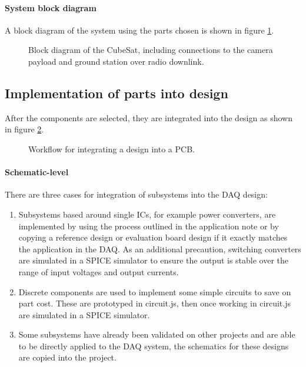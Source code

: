 \documentclass[a4paper,11pt]{article}
\begin{document}
\paragraph{System block diagram}

A block diagram of the system using the parts chosen is shown in figure \ref{fig:system-block-diagram}.

\begin{figure}[H]
  \centering
  
  \caption{Block diagram of the CubeSat, including connections to the camera payload and ground station over radio downlink.}
  \label{fig:system-block-diagram}
\end{figure}

\subsection{Implementation of parts into design}

After the components are selected, they are integrated into the design as shown in figure \ref{fig:implementation-workflow}.

\begin{figure}[H]
  \centering
  
  \caption{Workflow for integrating a design into a PCB.}
  \label{fig:implementation-workflow}
\end{figure}


\paragraph{Schematic-level}

There are three cases for integration of subsystems into the DAQ design:

\begin{enumerate}
  \item Subsystems based around single ICs, for example power converters, are implemented by using the process outlined in the  application note or by copying a reference design or evaluation board design if it exactly matches the application in the DAQ. As an additional precaution, switching converters are simulated in a SPICE simulator to ensure the output is stable over the range of input voltages and output currents.
  \item Discrete components are used to implement some simple circuits to save on part cost. These are prototyped in circuit.js, then once working in circuit.js are simulated in a SPICE simulator.
  \item Some subsystems have already been validated on other projects and are able to be directly applied to the DAQ system, the schematics for these designs are copied into the project.
\end{enumerate}
\end{document}
